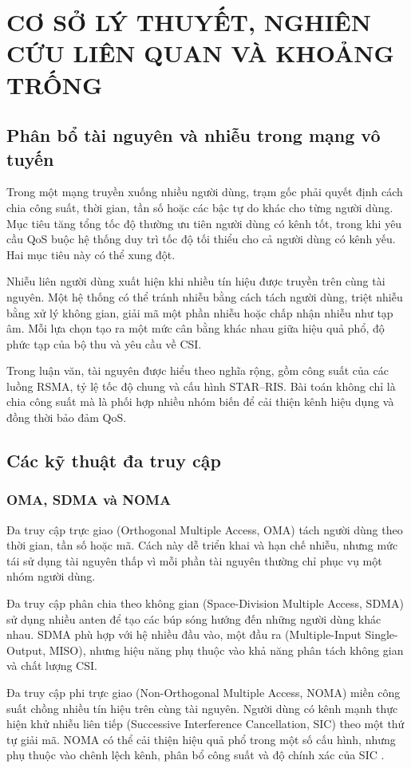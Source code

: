 \chapter{CƠ SỞ LÝ THUYẾT, NGHIÊN CỨU LIÊN QUAN VÀ KHOẢNG TRỐNG}
\label{chap:theory}

\section{Phân bổ tài nguyên và nhiễu trong mạng vô tuyến}
Trong một mạng truyền xuống nhiều người dùng, trạm gốc phải quyết định cách chia công suất, thời gian, tần số hoặc các bậc tự do khác cho từng người dùng. Mục tiêu tăng tổng tốc độ thường ưu tiên người dùng có kênh tốt, trong khi yêu cầu QoS buộc hệ thống duy trì tốc độ tối thiểu cho cả người dùng có kênh yếu. Hai mục tiêu này có thể xung đột.

Nhiễu liên người dùng xuất hiện khi nhiều tín hiệu được truyền trên cùng tài nguyên. Một hệ thống có thể tránh nhiễu bằng cách tách người dùng, triệt nhiễu bằng xử lý không gian, giải mã một phần nhiễu hoặc chấp nhận nhiễu như tạp âm. Mỗi lựa chọn tạo ra một mức cân bằng khác nhau giữa hiệu quả phổ, độ phức tạp của bộ thu và yêu cầu về CSI.

Trong luận văn, tài nguyên được hiểu theo nghĩa rộng, gồm công suất của các luồng RSMA, tỷ lệ tốc độ chung và cấu hình STAR--RIS. Bài toán không chỉ là chia công suất mà là phối hợp nhiều nhóm biến để cải thiện kênh hiệu dụng và đồng thời bảo đảm QoS.

\section{Các kỹ thuật đa truy cập}
\subsection{OMA, SDMA và NOMA}
Đa truy cập trực giao (Orthogonal Multiple Access, OMA) tách người dùng theo thời gian, tần số hoặc mã. Cách này dễ triển khai và hạn chế nhiễu, nhưng mức tái sử dụng tài nguyên thấp vì mỗi phần tài nguyên thường chỉ phục vụ một nhóm người dùng.

Đa truy cập phân chia theo không gian (Space-Division Multiple Access, SDMA) sử dụng nhiều anten để tạo các búp sóng hướng đến những người dùng khác nhau. SDMA phù hợp với hệ nhiều đầu vào, một đầu ra (Multiple-Input Single-Output, MISO), nhưng hiệu năng phụ thuộc vào khả năng phân tách không gian và chất lượng CSI.

Đa truy cập phi trực giao (Non-Orthogonal Multiple Access, NOMA) miền công suất chồng nhiều tín hiệu trên cùng tài nguyên. Người dùng có kênh mạnh thực hiện khử nhiễu liên tiếp (Successive Interference Cancellation, SIC) theo một thứ tự giải mã. NOMA có thể cải thiện hiệu quả phổ trong một số cấu hình, nhưng phụ thuộc vào chênh lệch kênh, phân bổ công suất và độ chính xác của SIC \cite{Clerckx2021NOMACritical}.

